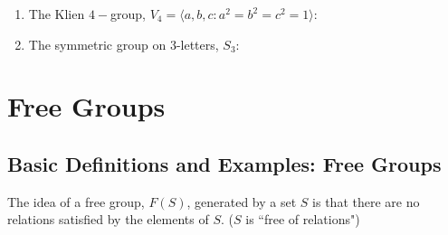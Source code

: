 \documentclass[12pt, a4paper, oneside, openright, titlepage]{book}
\begin{document}
\begin{eg}
\begin{enumerate}
\begin{figure}[H]
        \end{figure}
        \item The Klien $4-$group, $V_4 = \langle a,b,c: a^2=b^2=c^2=1\rangle$:
        \begin{figure}[H]
            \centering
            \label{fig:V4Lattice}
        \end{figure}
        \item The symmetric group on 3-letters, $S_3$:
        \begin{figure}[H]
            \centering
            \label{fig:S3Lattice}
        \end{figure}
    \end{enumerate}
\end{eg}


\chapter{\textsection\textsection Free Groups}

\section{\textsection Basic Definitions and Examples: Free Groups}

\begin{rmk}
        The idea of a free group, $F(S)$, generated by a set $S$ is that there are no relations satisfied by the elements of $S$. ($S$ is ``free of relations")
\end{rmk}
\end{document}
